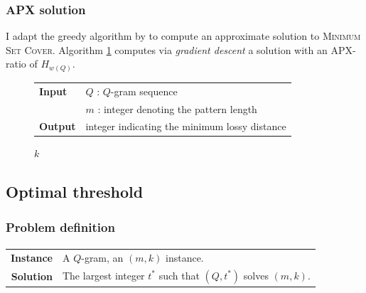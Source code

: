 \subsubsection{APX solution}

I adapt the greedy algorithm by \cite{Chvatal1979} to compute an approximate solution to \textsc{Minimum Set Cover}.
Algorithm \ref{alg:qgram-maxdist-apx} computes via \emph{gradient descent} a solution with an APX-ratio of $H_{w(Q)}$.

\begin{figure}[h]
\begin{center}
\begin{minipage}[t]{.8\textwidth}
\begin{algorithm}[H]
\begin{tabular}{ll}
\textbf{Input}  & $Q$ : $Q$-gram sequence\\
				& $m$ : integer denoting the pattern length\\
\textbf{Output} & integer indicating the minimum lossy distance\\
\end{tabular}
\begin{algorithmic}[1]
\EndWhile
\State \Return $k$
\end{algorithmic}
\label{alg:qgram-maxdist-apx}
\end{algorithm}
\end{minipage}
\end{center}
\end{figure}

\subsection{Optimal threshold}
\label{sub:qgram-optimal-threshold}


\subsubsection{Problem definition}

\paragraph{}
\begin{tabular}{rl}
{\bf Instance}	&	A $Q$-gram, an $(m,k)$ instance.\\
{\bf Solution}	&	The largest integer $t^*$ such that $(Q,t^*)$ solves $(m,k)$.\\
\end{tabular}
\\

